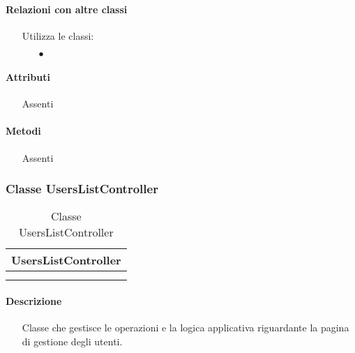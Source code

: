 \paragraph*{Relazioni con altre classi}
\begin{itemize}


\item[] Utilizza le classi:
\begin{itemize}
\item[$\bullet$] 
\end{itemize}
\end{itemize}

\paragraph*{Attributi}
\begin{itemize}
\item[] Assenti
\end{itemize}

\paragraph*{Metodi}
\begin{itemize}
\item[] Assenti
\end{itemize}

\subsubsection{Classe UsersListController}

\begin{table}[ht]
\begin{center}
\bgroup
\setlength{\arrayrulewidth}{0.6mm}
\def\arraystretch{1}
\begin{tabular}{ | p{12cm} | }
\hline
\centerline{\textbf{UsersListController}}
\\ \hline
 \\ 
\hline
 \\ 
\hline
\end{tabular}
\egroup
\caption{Classe UsersListController}
\end{center}
\end{table}

\paragraph*{Descrizione}
\begin{itemize}
\item[] Classe che gestisce le operazioni e la logica applicativa riguardante la pagina di gestione degli utenti.
\end{itemize}

